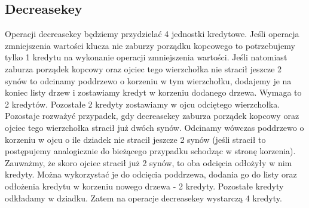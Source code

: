\documentclass{article}
\begin{document}
\subsection{Decreasekey}
Operacji decreasekey będziemy przydzielać 4 jednostki kredytowe. Jeśli operacja zmniejszenia wartości klucza nie zaburzy porządku kopcowego to potrzebujemy tylko 1 kredytu na wykonanie operacji zmniejszenia wartości. Jeśli natomiast zaburza porządek kopcowy oraz ojciec tego wierzchołka nie stracił jeszcze 2 synów to odcinamy poddrzewo o korzeniu w tym wierzchołku, dodajemy je na koniec listy drzew i zostawiamy kredyt w korzeniu dodanego drzewa. Wymaga to 2 kredytów. Pozostałe 2 kredyty zostawiamy w ojcu odciętego wierzchołka. Pozostaje rozważyć przypadek, gdy decreasekey zaburza porządek kopcowy oraz ojciec tego wierzchołka stracił już dwóch synów. Odcinamy wówczas poddrzewo o korzeniu w ojcu o ile dziadek nie stracił jeszcze 2 synów (jeśli stracił to postępujemy analogicznie do bieżącego przypadku schodząc w stronę korzenia). Zauważmy, że skoro ojciec stracił już 2 synów, to oba odcięcia odłożyły w nim kredyty. Można wykorzystać je do odcięcia poddrzewa, dodania go do listy oraz odłożenia kredytu w korzeniu nowego drzewa - 2 kredyty. Pozostałe kredyty odkładamy w dziadku. Zatem na operacje decreasekey wystarczą 4 kredyty.
\end{document}
